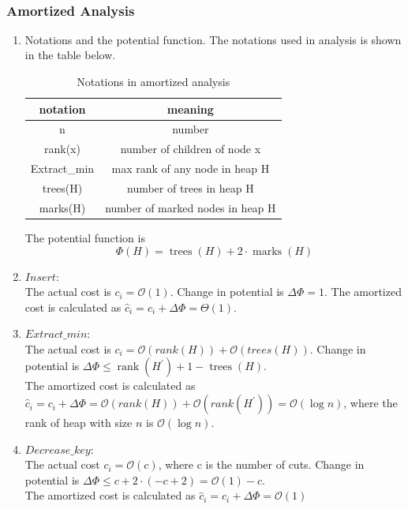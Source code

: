 \documentclass[catalog.tex]{subfiles}
\begin{document}

$\ $
\newpage
\subsubsection*{Amortized Analysis}
\begin{enumerate}
	\item Notations and the potential function.
	The notations used in analysis is shown in the table below. \\
	\begin{table}[h]
		\centering
		\begin{tabular}{cc}
		notation     & meaning                          \\ \hline
		n            & number                           \\
		rank(x)      & number of children of node x     \\
		Extract\_min & max rank of any node in heap H   \\
		trees(H)     & number of trees in heap H        \\
		marks(H)     & number of marked nodes in heap H
		\end{tabular}
		\caption{Notations in amortized analysis}
		\label{notation}
	\end{table}
	\par The potential function is ~\cite{ve281}
	$$
	\Phi(H)=\operatorname{trees}(H)+2 \cdot \operatorname{marks}(H)
	$$
	\item $Insert$: \\
	The actual cost is $c_i=\mathcal{O}(1)$. Change in potential is $\Delta \Phi = 1$. The amortized cost is calculated as $\hat{c}_{i}=c_{i}+\Delta \Phi=\Theta(1)$.
	\item $Extract\_min$: \\
	The actual cost is $c_{i}=\mathcal{O}({rank}(H))+\mathcal{O}({trees}(H))$. Change in potential is $\Delta \Phi \leq \operatorname{rank}\left(H^{\prime}\right)+1-\operatorname{trees}(H)$.\\
	The amortized cost is calculated as $\hat{c}_{i}=c_{i}+\Delta \Phi=\mathcal{O}(r a n k(H))+\mathcal{O}\left(r a n k\left(H^{\prime}\right)\right)=\mathcal{O}(\log n)$, where the rank of heap with size $n$ is $\mathcal{O}(\log n)$.
	\item $Decrease\_key$: \\
	The actual cost $c_{i}=\mathcal{O}(c)$, where c is the number of cuts. Change in potential is $\Delta \Phi \leq c+2 \cdot (-c+2) = \mathcal{O}(1)-c$. \\
	The amortized cost is calculated as $\hat{c}_{i}=c_{i}+\Delta \Phi=\mathcal{O}(1)$
\end{enumerate}
\singlespacing
\newpage
\printbibliography[title={References.},resetnumbers=true,heading=subbibliography]
\end{document}
